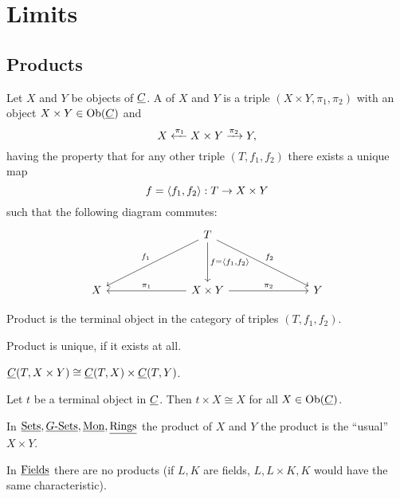 \chapter{Limits}

\section{Products}

\begin{definition*}
	Let \( X \) and \( Y \) be objects of \( \underline{C} \). A  of \( X \) and \( Y \) is a triple \( (X \times Y, \pi_1, \pi_2) \) with an object \( X \times Y \in \operatorname{Ob}(\underline{C}) \) and 
	\[
		X \xleftarrow{\pi_1} X \times Y \xrightarrow{\pi_2} Y,
	\]
	having the property that for any other triple \( (T, f_1, f_2) \) there exists a unique map
	\[
		f = \langle f_1, f_2 \rangle: T \to X \times Y
	\]
	such that the following diagram commutes:
	\[
		\begin{tikzcd}
			&&& T \\
			\\
			X &&& {X \times Y} &&& Y
			\arrow["{f_1}"', from=1-4, to=3-1]
			\arrow["{f = \langle f_1, f_2\rangle}", from=1-4, to=3-4]
			\arrow["{f_2}", from=1-4, to=3-7]
			\arrow["{\pi_1}"', from=3-4, to=3-1]
			\arrow["{\pi_2}", from=3-4, to=3-7]
		\end{tikzcd}
	\]
\end{definition*}

\begin{remarks*}
	\item Product is the terminal object in the category of triples \( (T, f_1, f_2) \).
	\item Product is unique, if it exists at all.
	\item \( \underline{C}(T, X \times Y) \cong \underline{C}(T, X) \times \underline{C}(T, Y) \).
	\item Let \( t \) be a terminal object in \( \underline{C} \). Then \( t \times X \cong X \) for all \( X \in \operatorname{Ob}(\underline{C}) \).
\end{remarks*}

\begin{examples*}
	\item In \( \underline{\mathrm{Sets}}, \underline{G\text{-}\mathrm{Sets}}, \underline{\mathrm{Mon}}, \underline{\mathrm{Rings}} \) the product of \( X \) and \( Y \) the product is the \enquote{usual} \( X \times Y \).
	\item In \( \underline{\mathrm{Fields}} \) there are no products (if \( L, K \) are fields, \( L, L \times K, K \) would have the same characteristic).
\end{examples*}

